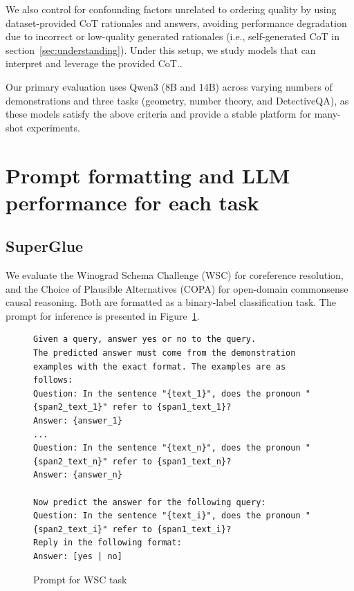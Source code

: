 \documentclass{article}
\theoremstyle{plain}
\theoremstyle{definition}
\theoremstyle{remark}
\begin{document}
We also control for confounding factors unrelated to ordering quality by using dataset-provided CoT rationales and answers, avoiding performance degradation due to incorrect or low-quality generated rationales (i.e., self-generated CoT in section~\ref{sec:understanding}).
Under this setup, we study models that can interpret and leverage the provided CoT..

Our primary evaluation uses Qwen3 (8B and 14B) across varying numbers of demonstrations and three tasks (geometry, number theory, and DetectiveQA), as these models satisfy the above criteria and provide a stable platform for many-shot experiments.



\section{Prompt formatting and LLM performance for each task}
\label{sc:apx_tasks}

\subsection{SuperGlue}

We evaluate the Winograd Schema Challenge (WSC) for coreference resolution, and the Choice of Plausible Alternatives (COPA) for open-domain commonsense causal reasoning. Both are formatted as a binary-label classification task. The prompt for inference is presented in Figure~\ref{fig:prompt_wsc}. %



\begin{figure}
    \centering
    {\tiny
\begin{lstlisting}
Given a query, answer yes or no to the query.
The predicted answer must come from the demonstration examples with the exact format. The examples are as follows:
Question: In the sentence "{text_1}", does the pronoun "{span2_text_1}" refer to {span1_text_1}?
Answer: {answer_1}
...
Question: In the sentence "{text_n}", does the pronoun "{span2_text_n}" refer to {span1_text_n}?
Answer: {answer_n}

Now predict the answer for the following query:
Question: In the sentence "{text_i}", does the pronoun "{span2_text_i}" refer to {span1_text_i}?
Reply in the following format:
Answer: [yes | no]
\end{lstlisting}
}
    \caption{Prompt for WSC task}
    \label{fig:prompt_wsc}

\end{figure}
\end{document}
